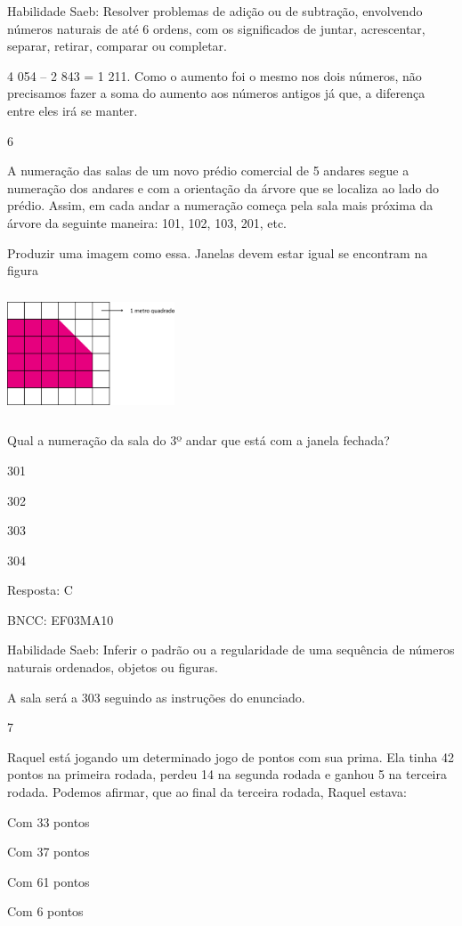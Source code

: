 \begin{escolha}
{\begin{escolha}
{Habilidade Saeb: Resolver problemas de adição ou de subtração,
envolvendo números naturais de até 6 ordens, com os significados de
juntar, acrescentar, separar, retirar, comparar ou completar.

4 054 -- 2 843 = 1 211. Como o aumento foi o mesmo nos dois números, não
precisamos fazer a soma do aumento aos números antigos já que, a
diferença entre eles irá se manter.

\num{6}

A numeração das salas de um novo prédio comercial de 5 andares segue a
numeração dos andares e com a orientação da árvore que se localiza ao
lado do prédio. Assim, em cada andar a numeração começa pela sala mais
próxima da árvore da seguinte maneira: 101, 102, 103, 201, etc.

Produzir uma imagem como essa. Janelas devem estar igual se encontram na
figura

\includegraphics[width=1.96154in,height=1.44792in]{media/image108.png}

Qual a numeração da sala do 3º andar que está com a janela fechada?

\begin{escolha}
\item
  301
\item
  302
\item
  303
\item
  304
\end{escolha}

Resposta: C

BNCC: EF03MA10

Habilidade Saeb: Inferir o padrão ou a regularidade de uma sequência de
números naturais ordenados, objetos ou figuras.

A sala será a 303 seguindo as instruções do enunciado.

\num{7}

Raquel está jogando um determinado jogo de pontos com sua prima. Ela
tinha 42 pontos na primeira rodada, perdeu 14 na segunda rodada e ganhou
5 na terceira rodada. Podemos afirmar, que ao final da terceira rodada,
Raquel estava:

\begin{escolha}
\item
  Com 33 pontos
\item
  Com 37 pontos
\item
  Com 61 pontos
\item
  Com 6 pontos
\end{escolha}

}
\end{escolha}}
\end{escolha}
